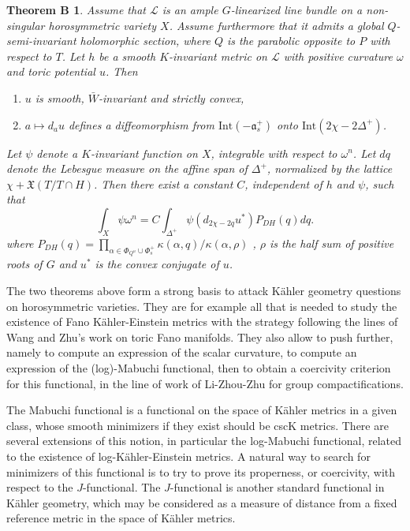 \documentclass{amsart}
\newtheorem*{thmb}{Theorem B}
\theoremstyle{definition}
\begin{document}
\begin{thmb}
Assume that $\mathcal{L}$ is an ample $G$-linearized line bundle on a 
non-singular horosymmetric variety $X$. Assume furthermore that it 
admits a global $Q$-semi-invariant holomorphic section, where $Q$ is the parabolic 
opposite to $P$ with respect to $T$. Let $h$ be a smooth $K$-invariant 
metric on $\mathcal{L}$ with positive curvature $\omega$ and toric potential $u$. 
Then 
\begin{enumerate}
\item $u$ is smooth, $\bar{W}$-invariant and strictly convex, 
\item $a\mapsto d_au$ defines a diffeomorphism from $\mathrm{Int}(-\mathfrak{a}_s^+)$ onto 
$\mathrm{Int}(2\chi-2\Delta^+)$. 
\end{enumerate}
Let $\psi$ denote a $K$-invariant function on $X$, integrable with 
respect to $\omega^n$. 
Let $dq$ denote the Lebesgue measure on the affine span of $\Delta^+$,
normalized by the lattice $\chi+\mathfrak{X}(T/T\cap H)$. 
Then there exist a constant $C$, independent of $h$ and $\psi$, such that 
\[
\int_X\psi\omega^n  = 
C\int_{\Delta^+} \psi(d_{2\chi-2q}u^*)
P_{DH}(q) dq. 
\]
where 
$P_{DH}(q)=\prod_{\alpha\in\Phi_{Q^u}\cup \Phi_s^+} \kappa(\alpha,q)/\kappa(\alpha,\rho)$ ,
$\rho$ is the half sum of positive roots of $G$ and $u^*$ is the convex 
conjugate of $u$.
\end{thmb} 

The two theorems above form a strong basis to attack Kähler geometry 
questions on horosymmetric varieties. They are for example all that is needed 
to study the existence of Fano Kähler-Einstein metrics with the strategy 
following the lines of Wang and Zhu's work on toric Fano manifolds. 
They also allow to push further, namely to compute an expression of the 
scalar curvature, to compute an expression of the (log)-Mabuchi functional, 
then to obtain a coercivity criterion for this functional, in the line 
of work of Li-Zhou-Zhu for group compactifications. 

The Mabuchi functional 
is a functional on the space of Kähler metrics in a given class, 
whose smooth minimizers if they exist should be cscK metrics. 
There are several extensions of this notion, in particular 
the log-Mabuchi functional, related to the existence 
of log-Kähler-Einstein metrics. 
A natural way to search for minimizers of this functional is to 
try to prove its properness, or coercivity, with respect to the 
$J$-functional. The $J$-functional is another standard functional in Kähler 
geometry, which may be considered as a measure of distance from a 
fixed reference metric in the space of Kähler metrics.
\end{document}

